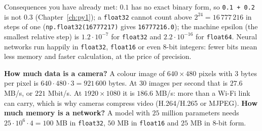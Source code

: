\begin{center}
\label{fig:hw1_float}
\end{center}
Consequences you have already met: $0.1$ has no exact binary form, so \texttt{0.1 + 0.2} is not $0.3$ (Chapter~\ref{ch:py1}); a \texttt{float32} cannot count above $2^{24}=16\,777\,216$ in steps of one (\texttt{np.float32(16777217)} gives \texttt{16777216.0}); the machine epsilon (the smallest relative step) is $1.2\cdot10^{-7}$ for \texttt{float32} and $2.2\cdot10^{-16}$ for \texttt{float64}. Neural networks run happily in \texttt{float32}, \texttt{float16} or even 8-bit integers: fewer bits mean less memory and faster calculation, at the price of precision.

\begin{example}
\textbf{How much data is a camera?} A colour image of $640\times480$ pixels with $3$ bytes per pixel is $640\cdot480\cdot3=921\,600$ bytes. At $30$ images per second that is $27.6$ MB/s, or $221$ Mbit/s. At $1920\times1080$ it is $186.6$ MB/s: more than a Wi-Fi link can carry, which is why cameras compress video (H.264/H.265 or MJPEG). \textbf{How much memory is a network?} A model with $25$ million parameters needs $25\cdot10^6\cdot4=100$ MB in \texttt{float32}, $50$ MB in \texttt{float16} and $25$ MB in 8-bit form.
\end{example}

